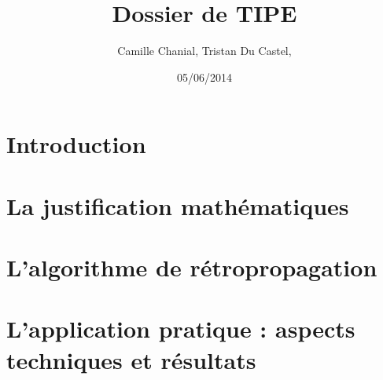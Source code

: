 \documentclass[a4paper, 11pt]{article}
\begin{document}
 
\title{Dossier de TIPE}
\author{Camille Chanial, Tristan Du Castel, }
\date{05/06/2014} 
 
\maketitle

 
\tableofcontents
 

\newpage

\part{Introduction}
\part{La justification mathématiques}
\part{L'algorithme de rétropropagation}
\part{L'application pratique : aspects techniques et résultats}

 
\end{document}
